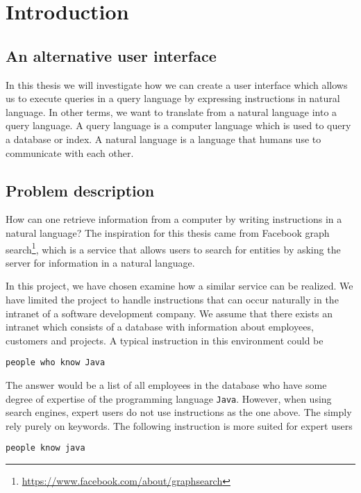 \chapter{Introduction}\label{ch:introduction}
\section{An alternative user interface}
In this thesis we will investigate how we can create a user interface which allows us to execute queries in a query language by expressing instructions in natural language. In other terms, we want to translate from a natural language into a query language. A query language is a computer language which is used to query a database or index. A natural language is a language that humans use to communicate with each other.

\section{Problem description\label{sec:problem-description}}
How can one retrieve information from a computer by writing instructions in a natural language? The inspiration for this thesis came from Facebook graph search\footnote{\url{https://www.facebook.com/about/graphsearch}}, which is a service that allows users to search for entities by asking the server for information in a natural language.

In this project, we have chosen examine how a similar service can be realized. We have limited the project to handle instructions that can occur naturally in the intranet of a software development company. We assume that there exists an intranet which consists of a database with information about employees, customers and projects. A typical instruction in this environment could be

\begin{verbatim}
people who know Java
\end{verbatim}

The answer would be a list of all employees in the database who have some degree of expertise of the programming language \texttt{Java}. However, when using search engines, expert users do not use instructions as the one above. The simply rely purely on keywords\cite{mayer:2007}. The following instruction is more suited for expert users

\begin{verbatim}
people know java
\end{verbatim}

